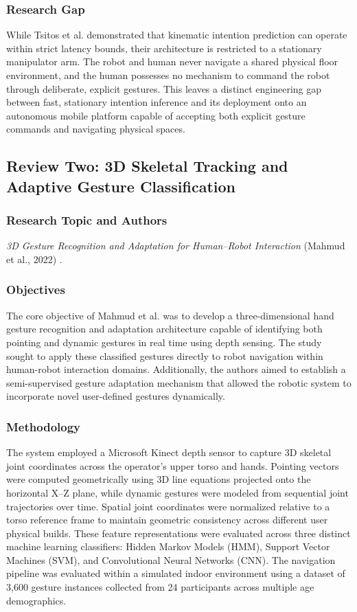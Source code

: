 \subsubsection{Research Gap}
While Tsitos et al. demonstrated that kinematic intention prediction can operate within strict latency bounds, their architecture is restricted to a stationary manipulator arm. The robot and human never navigate a shared physical floor environment, and the human possesses no mechanism to command the robot through deliberate, explicit gestures. This leaves a distinct engineering gap between fast, stationary intention inference and its deployment onto an autonomous mobile platform capable of accepting both explicit gesture commands and navigating physical spaces.

\subsection{Review Two: 3D Skeletal Tracking and Adaptive Gesture Classification}

\subsubsection{Research Topic and Authors}
\textit{3D Gesture Recognition and Adaptation for Human--Robot Interaction} (Mahmud et al., 2022) \cite{mahmud2022}.

\subsubsection{Objectives}
The core objective of Mahmud et al. was to develop a three-dimensional hand gesture recognition and adaptation architecture capable of identifying both pointing and dynamic gestures in real time using depth sensing. The study sought to apply these classified gestures directly to robot navigation within human-robot interaction domains. Additionally, the authors aimed to establish a semi-supervised gesture adaptation mechanism that allowed the robotic system to incorporate novel user-defined gestures dynamically.

\subsubsection{Methodology}
The system employed a Microsoft Kinect depth sensor to capture 3D skeletal joint coordinates across the operator's upper torso and hands. Pointing vectors were computed geometrically using 3D line equations projected onto the horizontal X--Z plane, while dynamic gestures were modeled from sequential joint trajectories over time. Spatial joint coordinates were normalized relative to a torso reference frame to maintain geometric consistency across different user physical builds. These feature representations were evaluated across three distinct machine learning classifiers: Hidden Markov Models (HMM), Support Vector Machines (SVM), and Convolutional Neural Networks (CNN). The navigation pipeline was evaluated within a simulated indoor environment using a dataset of 3,600 gesture instances collected from 24 participants across multiple age demographics.

